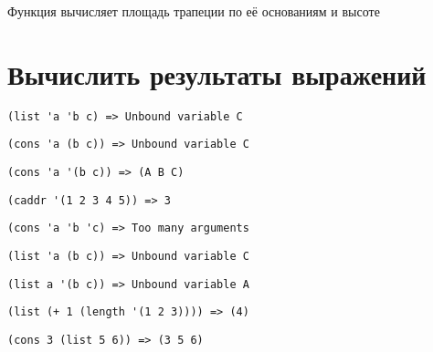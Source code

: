 \problem Функция вычисляет площадь трапеции по её основаниям и высоте




\section{Вычислить результаты выражений}

\problem \hfill

\begin{lstlisting}
(list 'a 'b c) => Unbound variable C
\end{lstlisting}


\problem \hfill

\begin{lstlisting}
(cons 'a (b c)) => Unbound variable C
\end{lstlisting}


\problem \hfill

\begin{lstlisting}
(cons 'a '(b c)) => (A B C) 
\end{lstlisting}


\problem \hfill

\begin{lstlisting}
(caddr '(1 2 3 4 5)) => 3
\end{lstlisting}


\problem \hfill

\begin{lstlisting}
(cons 'a 'b 'c) => Too many arguments
\end{lstlisting}


\problem \hfill

\begin{lstlisting}
(list 'a (b c)) => Unbound variable C
\end{lstlisting}


\problem \hfill

\begin{lstlisting}
(list a '(b c)) => Unbound variable A
\end{lstlisting}


\problem \hfill

\begin{lstlisting}
(list (+ 1 (length '(1 2 3)))) => (4) 
\end{lstlisting}


\problem \hfill

\begin{lstlisting}
(cons 3 (list 5 6)) => (3 5 6)
\end{lstlisting}


